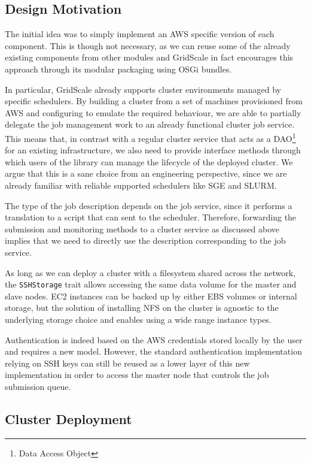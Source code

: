 \subsection{Design Motivation}

The initial idea was to simply implement an AWS specific version of each component. This is though not necessary, as we can reuse some of the already existing components from other modules and GridScale in fact encourages this approach through its modular packaging using OSGi bundles.

In particular, GridScale already supports cluster environments managed by specific schedulers. By building a cluster from a set of machines provisioned from AWS and configuring to emulate the required behaviour, we are able to partially delegate the job management work to an already functional cluster job service. This means that, in contrast with a regular cluster service that acts as a DAO\footnote{Data Access Object} for an existing infrastructure, we also need to provide interface methods through which users of the library can manage the lifecycle of the deployed cluster. We argue that this is a sane choice from an engineering perspective, since we are already familiar with reliable supported schedulers like SGE and SLURM.

The type of the job description depends on the job service, since it performs a translation to a script that can sent to the scheduler. Therefore, forwarding the submission and monitoring methods to a cluster service as discussed above implies that we need to directly use the description corresponding to the job service.

As long as we can deploy a cluster with a filesystem shared across the network, the \verb|SSHStorage| trait allows accessing the same data volume for the master and slave nodes. EC2 instances can be backed up by either EBS volumes or internal storage, but the solution of installing NFS on the cluster is agnostic to the underlying storage choice and enables using a wide range instance types.

Authentication is indeed based on the AWS credentials stored locally by the user and requires a new model. However, the standard authentication implementation relying on SSH keys can still be reused as a lower layer of this new implementation in order to access the master node that controls the job submission queue.

\subsection{Cluster Deployment}


